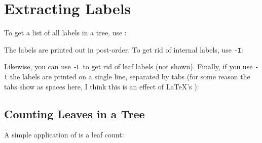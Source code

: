 \section{Extracting Labels}
\label{sct_labels}

To get a list of all labels in a tree, use :




\noindent{}The labels are printed out in post-order. To get rid of internal labels, use \texttt{-I}:




\noindent{}Likewise, you can use \texttt{-L} to get rid of leaf labels (not shown). Finally, if you use \texttt{-t} the labels are printed on a single line, separated by tabs (for some reason the tabs show as spaces here, I think this is an effect of \LaTeX{}'s \verb++):




\subsection{Counting Leaves in a Tree}
\label{sct_counting_leaves}

A simple application of  is a leaf count:





